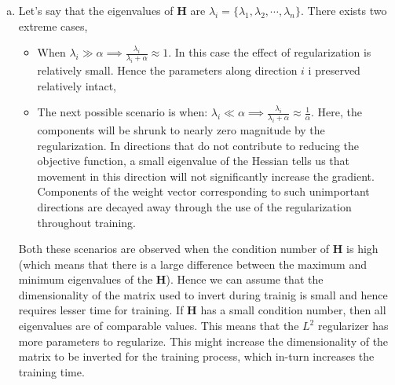 \documentclass[fleqn]{article}
\begin{document}
\begin{enumerate}[a)]
\item
	Let's say that the eigenvalues of $\bm{H}$ are $ \lambda_i = \{ \lambda_1, \lambda_2, \cdots, \lambda_n \}$. There exists two extreme cases,
	\begin{itemize}
	\item When $\lambda_i \gg \alpha \implies \frac{\lambda_i}{\lambda_i + \alpha} \approx 1$. In this case the effect of regularization is relatively small. Hence the parameters along direction $i$ i preserved relatively intact,
	\item The next possible scenario is when: $\lambda_i \ll \alpha \implies \frac{\lambda_i}{\lambda_i + \alpha} \approx \frac{1}{\alpha}$. Here, the components will be shrunk to nearly zero magnitude by the regularization. In directions that do not contribute to reducing the objective function, a small eigenvalue of the Hessian tells us that movement in this direction will not significantly increase the gradient. Components of the weight vector corresponding to such unimportant directions are decayed away through the use of the regularization throughout training.
	 \end{itemize}
	 
	 Both these scenarios are observed when the condition number of $\bm{H}$ is high (which means that there is a large difference between the maximum and minimum eigenvalues of the $\bm{H}$). Hence we can assume that the dimensionality of the matrix used to invert during trainig is small and hence requires lesser time for training.
	 If $\bm{H}$ has a small condition number, then all eigenvalues are of comparable values. This means that the $L^2$ regularizer has more parameters to regularize. This might increase the dimensionality of the matrix to be inverted for the training process, which in-turn increases the training time.
	\vspace{40mm}
\end{enumerate}
\end{document}
